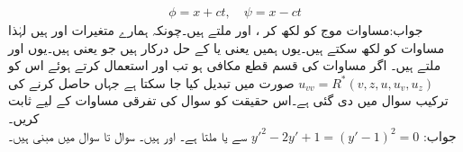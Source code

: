 \begin{align*}
\phi=x+ct,\quad \psi=x-ct
\end{align*}
جواب:\quad مساوات موج کو  لکھ کر ،  اور  ملتے ہیں۔چونکہ ہمارے متغیرات  اور  ہیں لہٰذا  مساوات  کو  لکھ سکتے ہیں۔یوں ہمیں  یعنی  یا  کے حل درکار ہیں جو  یعنی  ہیں۔یوں  اور  ملتے ہیں۔
\quad
اگر مساوات  کی قسم قطع مکافی ہو تب   اور  استعمال کرتے ہوئے اس کو
$u_{vv}=R^*(v,z,u,u_v,u_z)$
صورت میں تبدیل کیا جا سکتا ہے جہاں  حاصل کرنے کی ترکیب سوال  میں دی گئی ہے۔اس حقیقت کو سوال  کی تفرقی مساوات کے لیے ثابت کریں۔\\
جواب:\quad
$y'^2-2y'+1=(y'-1)^2=0$
سے  یا  ملتا ہے۔  اور  ہیں۔ 
سوال  تا سوال   میں مبنی ہیں۔

